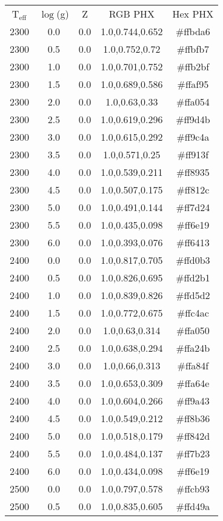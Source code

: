 \begin{tabular}{ccccc}
T$_{\mathrm{eff}}$ & $\log$(g) & Z & RGB PHX & Hex PHX \\ 
2300 & 0.0 & 0.0 & 1.0,0.744,0.652 & \#ffbda6 \\ 
2300 & 0.5 & 0.0 & 1.0,0.752,0.72 & \#ffbfb7 \\ 
2300 & 1.0 & 0.0 & 1.0,0.701,0.752 & \#ffb2bf \\ 
2300 & 1.5 & 0.0 & 1.0,0.689,0.586 & \#ffaf95 \\ 
2300 & 2.0 & 0.0 & 1.0,0.63,0.33 & \#ffa054 \\ 
2300 & 2.5 & 0.0 & 1.0,0.619,0.296 & \#ff9d4b \\ 
2300 & 3.0 & 0.0 & 1.0,0.615,0.292 & \#ff9c4a \\ 
2300 & 3.5 & 0.0 & 1.0,0.571,0.25 & \#ff913f \\ 
2300 & 4.0 & 0.0 & 1.0,0.539,0.211 & \#ff8935 \\ 
2300 & 4.5 & 0.0 & 1.0,0.507,0.175 & \#ff812c \\ 
2300 & 5.0 & 0.0 & 1.0,0.491,0.144 & \#ff7d24 \\ 
2300 & 5.5 & 0.0 & 1.0,0.435,0.098 & \#ff6e19 \\ 
2300 & 6.0 & 0.0 & 1.0,0.393,0.076 & \#ff6413 \\ 
2400 & 0.0 & 0.0 & 1.0,0.817,0.705 & \#ffd0b3 \\ 
2400 & 0.5 & 0.0 & 1.0,0.826,0.695 & \#ffd2b1 \\ 
2400 & 1.0 & 0.0 & 1.0,0.839,0.826 & \#ffd5d2 \\ 
2400 & 1.5 & 0.0 & 1.0,0.772,0.675 & \#ffc4ac \\ 
2400 & 2.0 & 0.0 & 1.0,0.63,0.314 & \#ffa050 \\ 
2400 & 2.5 & 0.0 & 1.0,0.638,0.294 & \#ffa24b \\ 
2400 & 3.0 & 0.0 & 1.0,0.66,0.313 & \#ffa84f \\ 
2400 & 3.5 & 0.0 & 1.0,0.653,0.309 & \#ffa64e \\ 
2400 & 4.0 & 0.0 & 1.0,0.604,0.266 & \#ff9a43 \\ 
2400 & 4.5 & 0.0 & 1.0,0.549,0.212 & \#ff8b36 \\ 
2400 & 5.0 & 0.0 & 1.0,0.518,0.179 & \#ff842d \\ 
2400 & 5.5 & 0.0 & 1.0,0.484,0.137 & \#ff7b23 \\ 
2400 & 6.0 & 0.0 & 1.0,0.434,0.098 & \#ff6e19 \\ 
2500 & 0.0 & 0.0 & 1.0,0.797,0.578 & \#ffcb93 \\ 
2500 & 0.5 & 0.0 & 1.0,0.835,0.605 & \#ffd49a \\ 

\end{tabular}
